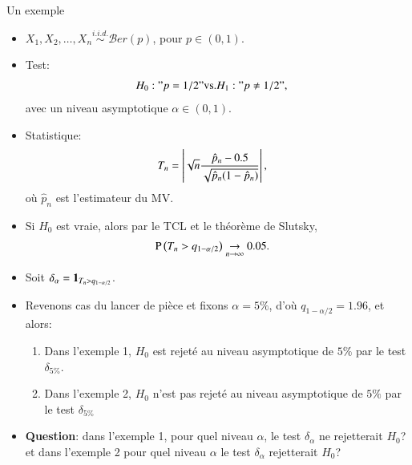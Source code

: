 \begin{frame}
    [allowframebreaks]{Un exemple}
    \begin{itemize}
        \item $X_1, X_2, \ldots, X_n \overset{i.i.d.}{\sim} \mathcal{B}er(p)$, pour $p\in (0, 1)$.
        \item Test: \begin{align*}H_0: "p=1/2" &\text{vs.} H_1:  "p\neq 1/2",\end{align*}
        avec un niveau asymptotique $\alpha\in(0,1)$.
        \item Statistique: \begin{align*}
            T_n &= \left\vert { \sqrt{n}\frac{\hat{p}_n - 0.5}{\sqrt{\hat{p}_n(1-\hat{p}_n)}}} \right\vert, 
        \end{align*}
        où $\hat{p}_n$ est l'estimateur du MV.
        \item Si $H_0$ est vraie, alors par le TCL et le théorème de Slutsky, \begin{align*}
            \operatorname{P}\left(T_n > q_{1-\alpha/2}\right)&\underset{n{\rightarrow}\infty}{\rightarrow} 0.05.
        \end{align*}
        \item Soit $\delta_\alpha = \mathbf{1}_{T_n>q_{1-\alpha/2}}$.
        
        \framebreak 

        \item Revenons cas du lancer de pièce et fixons $\alpha=5\%$, d'où $q_{1-\alpha/2} = 1.96$, et alors:
        \begin{enumerate}[-]
            \item Dans l'exemple 1, $H_0$ est rejeté au niveau asymptotique de $5\%$ par le test $\delta_{5\%}$.
            \item Dans l'exemple 2, $H_0$ n'est pas rejeté au niveau asymptotique de $5\%$ par le test $\delta_{5\%}$
        \end{enumerate}
        \item \textbf{Question}: dans l'exemple 1, pour quel niveau $\alpha$, le test $\delta_\alpha$ ne rejetterait $H_0$? et dans 
        l'exemple 2 pour quel niveau $\alpha$ le test $\delta_\alpha$ rejetterait $H_0$?
    \end{itemize}
\end{frame}
